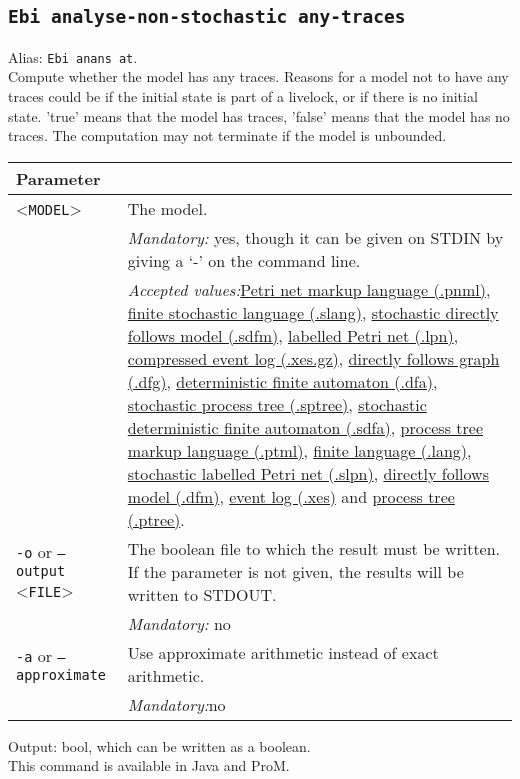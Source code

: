 {\subsection{\texttt{Ebi analyse-non-stochastic any-traces}}
\label{command:Ebi analyse-non-stochastic any-traces}
Alias: \texttt{Ebi anans at}.\\
Compute whether the model has any traces.
        Reasons for a model not to have any traces could be if the initial state is part of a livelock, or if there is no initial state.
        'true' means that the model has traces, 'false' means that the model has no traces.
        The computation may not terminate if the model is unbounded.\\
\begin{tabularx}{\linewidth}{lX}
\toprule
Parameter \\\midrule
<\texttt{MODEL}>&The model.\\
&\textit{Mandatory:} \quad yes, though it can be given on STDIN by giving a `-' on the command line.\\
&\textit{Accepted values:}\quad \hyperref[filehandler:Petri net markup language]{Petri net markup language (.pnml)}, \hyperref[filehandler:finite stochastic language]{finite stochastic language (.slang)}, \hyperref[filehandler:stochastic directly follows model]{stochastic directly follows model (.sdfm)}, \hyperref[filehandler:labelled Petri net]{labelled Petri net (.lpn)}, \hyperref[filehandler:compressed event log]{compressed event log (.xes.gz)}, \hyperref[filehandler:directly follows graph]{directly follows graph (.dfg)}, \hyperref[filehandler:deterministic finite automaton]{deterministic finite automaton (.dfa)}, \hyperref[filehandler:stochastic process tree]{stochastic process tree (.sptree)}, \hyperref[filehandler:stochastic deterministic finite automaton]{stochastic deterministic finite automaton (.sdfa)}, \hyperref[filehandler:process tree markup language]{process tree markup language (.ptml)}, \hyperref[filehandler:finite language]{finite language (.lang)}, \hyperref[filehandler:stochastic labelled Petri net]{stochastic labelled Petri net (.slpn)}, \hyperref[filehandler:directly follows model]{directly follows model (.dfm)}, \hyperref[filehandler:event log]{event log (.xes)} and \hyperref[filehandler:process tree]{process tree (.ptree)}.\\
\texttt{-o} or \texttt{--output} <\texttt{FILE}> &
The boolean file to which the result must be written. If the parameter is not given, the results will be written to STDOUT.\\
&\textit{Mandatory:} \quad no\\
\texttt{-a} or \texttt{--approximate} & Use approximate arithmetic instead of exact arithmetic.\\
&\textit{Mandatory:}\quad no\\
\bottomrule
\end{tabularx}
\noindent Output: bool, which can be written as a boolean.
\\This command is available in Java and ProM.
}

